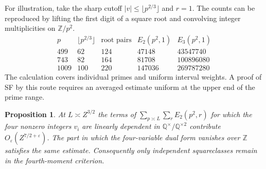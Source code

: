 \documentclass[11pt,letterpaper]{article}
\newtheorem{proposition}[proposition]{Proposition}
\theoremstyle{definition}
\begin{document}
For illustration, take the sharp cutoff $|v|\le\lfloor p^{2/3}\rfloor$
and $r=1$. The counts can be reproduced by lifting the first digit of
a square root and convolving integer multiplicities on $\mathbb Z/p^2$.
\[
 \begin{array}{c|r|r|r|r}
       p & \lfloor p^{2/3}\rfloor &\text{root pairs}&E_2(p^2,1)&E_3(p^2,1)\\\hline
       499&62&124&47148&43547740\\
       743&82&164&81708&100896080\\
       1009&100&220&147036&269787280
 \end{array}
\]
The calculation covers individual primes and uniform interval weights.
A proof of SF by this route requires an averaged estimate uniform at
the upper end of the prime range.

\begin{proposition}\label{c3:independent-radicals}
At $L\asymp Z^{3/2}$ the terms of
$\sum_{p\asymp L}\sum_r E_2(p^2,r)$ for which the four nonzero
integers $v_i$ are linearly dependent in
$\mathbb Q^\times/\mathbb Q^{\times2}$ contribute
$O_\varepsilon(Z^{7/2+\varepsilon})$. The part in which the
four-variable dual form vanishes over $\mathbb Z$ satisfies the
same estimate. Consequently only independent squareclasses remain
in the fourth-moment criterion.
\end{proposition}
\end{document}
